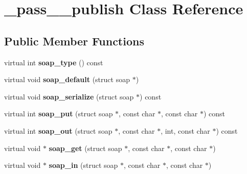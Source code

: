 \hypertarget{class__pass____publish}{
\section{\_\-pass\_\-\_\-publish Class Reference}
\label{class__pass____publish}
}
\subsection*{Public Member Functions}
\begin{DoxyCompactItemize}
\item 
\hypertarget{class__pass____publish_a2e7a5ded068eef91b45f1739dad5e932}{
virtual int {\bfseries soap\_\-type} () const }
\label{class__pass____publish_a2e7a5ded068eef91b45f1739dad5e932}

\item 
\hypertarget{class__pass____publish_a6efe8768e9ffcba4d01ffc2142ff2709}{
virtual void {\bfseries soap\_\-default} (struct soap $\ast$)}
\label{class__pass____publish_a6efe8768e9ffcba4d01ffc2142ff2709}

\item 
\hypertarget{class__pass____publish_ad1922f6dc5391d737bdb52ab28610f3b}{
virtual void {\bfseries soap\_\-serialize} (struct soap $\ast$) const }
\label{class__pass____publish_ad1922f6dc5391d737bdb52ab28610f3b}

\item 
\hypertarget{class__pass____publish_a965497a5098503e0b60949dcadb78c18}{
virtual int {\bfseries soap\_\-put} (struct soap $\ast$, const char $\ast$, const char $\ast$) const }
\label{class__pass____publish_a965497a5098503e0b60949dcadb78c18}

\item 
\hypertarget{class__pass____publish_ad2b1ec89a643747ac4586d6580dc9a9c}{
virtual int {\bfseries soap\_\-out} (struct soap $\ast$, const char $\ast$, int, const char $\ast$) const }
\label{class__pass____publish_ad2b1ec89a643747ac4586d6580dc9a9c}

\item 
\hypertarget{class__pass____publish_ac4d33eb91ae66a13c7f31f33d0a79e0d}{
virtual void $\ast$ {\bfseries soap\_\-get} (struct soap $\ast$, const char $\ast$, const char $\ast$)}
\label{class__pass____publish_ac4d33eb91ae66a13c7f31f33d0a79e0d}

\item 
\hypertarget{class__pass____publish_a8cafd7fc427377ca5146c4e0666a3020}{
virtual void $\ast$ {\bfseries soap\_\-in} (struct soap $\ast$, const char $\ast$, const char $\ast$)}
\label{class__pass____publish_a8cafd7fc427377ca5146c4e0666a3020}

\end{DoxyCompactItemize}
